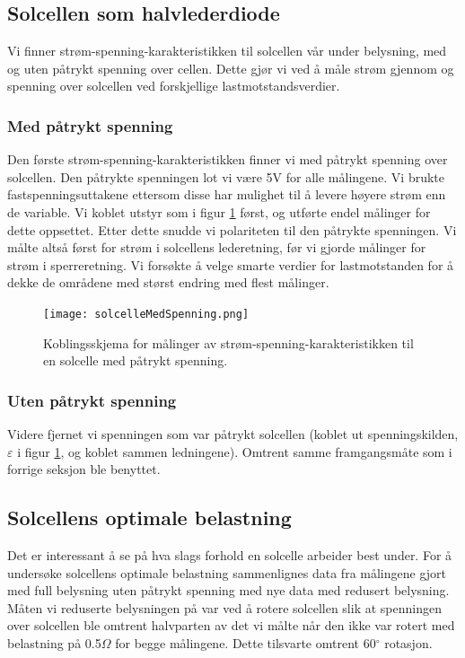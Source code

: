 \documentclass[a4paper,11pt, twocolumn]{article}
\begin{document}
\subsection{Solcellen som halvlederdiode}
Vi finner strøm-spenning-karakteristikken til solcellen vår under belysning, med og uten påtrykt spenning over cellen. Dette gjør vi ved å måle strøm gjennom og spenning over solcellen ved forskjellige lastmotstandsverdier. 
\subsubsection{Med påtrykt spenning}
Den første strøm-spenning-karakteristikken finner vi med påtrykt spenning over solcellen. Den påtrykte spenningen lot vi være 5V for alle målingene. Vi brukte fastspenningsuttakene ettersom disse har mulighet til å levere høyere strøm enn de variable. Vi koblet utstyr som i figur \ref{fig:solcelleMedSpenning} først, og utførte endel målinger for dette oppsettet. Etter dette snudde vi polariteten til den påtrykte spenningen. Vi målte altså først for strøm i solcellens lederetning, før vi gjorde målinger for strøm i sperreretning. Vi forsøkte å velge smarte verdier for lastmotstanden for å dekke de områdene med størst endring med flest målinger.

\begin{figure}[!ht]
	\texttt{[image: solcelleMedSpenning.png]}
	\caption{Koblingsskjema for målinger av strøm-spenning-karakteristikken til en solcelle med påtrykt spenning.}
	\label{fig:solcelleMedSpenning}
\end{figure}

\subsubsection{Uten påtrykt spenning}
Videre fjernet vi spenningen som var påtrykt solcellen (koblet ut spenningskilden, $\varepsilon$ i figur \ref{fig:solcelleMedSpenning}, og koblet sammen ledningene). Omtrent samme framgangsmåte som i forrige seksjon ble benyttet.
\subsection{Solcellens optimale belastning}
Det er interessant å se på hva slags forhold en solcelle arbeider best under.
For å undersøke solcellens optimale belastning sammenlignes data fra målingene gjort med full belysning uten påtrykt spenning med nye data med redusert belysning. Måten vi reduserte belysningen på var ved å rotere solcellen slik at spenningen over solcellen ble omtrent halvparten av det vi målte når den ikke var rotert med belastning på 0.5$\Omega$ for begge målingene. Dette tilsvarte omtrent 60$^\circ$ rotasjon.
\end{document}
